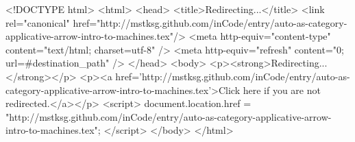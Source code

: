 <!DOCTYPE html>
<html>
<head>
<title>Redirecting...</title>
<link rel="canonical" href="http://mstksg.github.com/inCode/entry/auto-as-category-applicative-arrow-intro-to-machines.tex"/>
<meta http-equiv="content-type" content="text/html; charset=utf-8" />
<meta http-equiv="refresh" content="0; url=#{destination_path}" />
</head>
<body>
  <p><strong>Redirecting...</strong></p>
  <p><a href='http://mstksg.github.com/inCode/entry/auto-as-category-applicative-arrow-intro-to-machines.tex'>Click here if you are not redirected.</a></p>
  <script>
    document.location.href = "http://mstksg.github.com/inCode/entry/auto-as-category-applicative-arrow-intro-to-machines.tex";
  </script>
</body>
</html>
